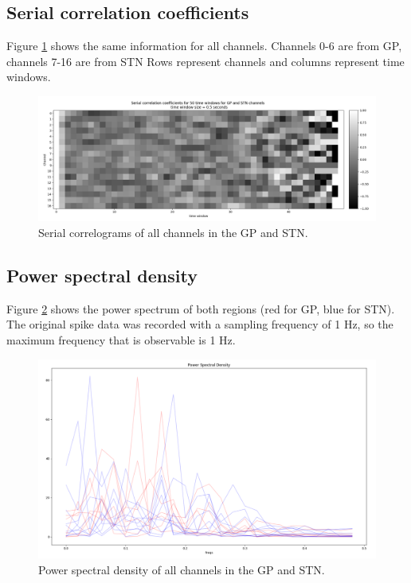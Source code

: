 \documentclass{kththesis}
\begin{document}
\subsection{Serial correlation coefficients}

Figure \ref{fig:corr3} shows the same information for all channels. Channels 0-6 are from GP, channels 7-16 are from STN
Rows represent channels and columns represent time windows.

\begin{figure}[H]
    \centering
    \centerline{\includegraphics[width=1\textwidth]{images/spiking/autocorr_all.png}}
    \caption{Serial correlograms of all channels in the GP and STN.}
    \label{fig:corr3}
\end{figure}

\subsection{Power spectral density}

Figure \ref{fig:PS3} shows the power spectrum of both regions (red for GP, blue for STN).
The original spike data was recorded with a sampling frequency of 1 Hz, so the maximum frequency that is observable is 1 Hz.

\begin{figure}[H]
    \centering
    \centerline{\includegraphics[width=1\textwidth]{images/spiking/powerSpect_all.png}}
    \caption{Power spectral density of all channels in the GP and STN.}
    \label{fig:PS3}
\end{figure}
\end{document}
